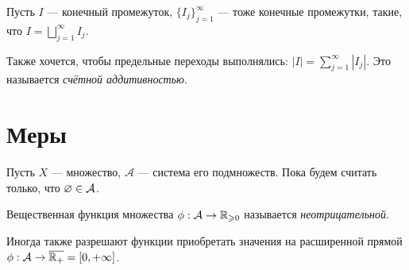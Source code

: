 \documentclass[a4paper]{report}
\begin{document}
    Пусть $I$ --- конечный промежуток, $\{I_j\}_{j=1}^{\infty}$ --- тоже конечные промежутки, такие, что $I = \bigsqcup\limits_{j = 1}^{\infty}I_j$.

    Также хочется, чтобы предельные переходы выполнялись: $|I| = \sum\limits_{j = 1}^{\infty}|I_j|$.
    Это называется \emph{счётной аддитивностью}.


    \section{Меры}
    Пусть $X$ --- множество, $\mathcal{A}$ --- система его подмножеств.
    Пока будем считать только, что $\varnothing \in \mathcal{A}$.

    Вещественная функция множества $\phi: \mathcal{A} \rightarrow \mathbb{R}_{\geqslant 0}$ называется \emph{неотрицательной}.

    Иногда также разрешают функции приобретать значения на расширенной прямой $\phi: \mathcal{A} \rightarrow \overline{\mathbb{R}_+} = [0, +\infty]$.
\end{document}
